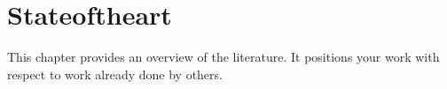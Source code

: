 \chapter{Stateoftheart}
This chapter provides an overview of the literature. It positions your work with respect to
work already done by others.
